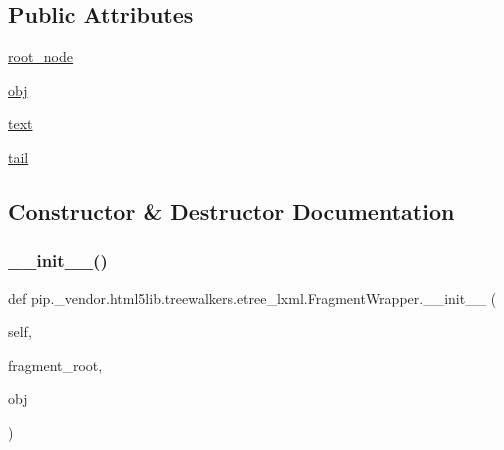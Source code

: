 \subsection*{Public Attributes}
\begin{DoxyCompactItemize}
\item 
\hyperlink{classpip_1_1__vendor_1_1html5lib_1_1treewalkers_1_1etree__lxml_1_1FragmentWrapper_ad91c1647c32b3060bf8d059090138372}{root\+\_\+node}
\item 
\hyperlink{classpip_1_1__vendor_1_1html5lib_1_1treewalkers_1_1etree__lxml_1_1FragmentWrapper_a0f74154790d95e13a7c0f260778d8c7e}{obj}
\item 
\hyperlink{classpip_1_1__vendor_1_1html5lib_1_1treewalkers_1_1etree__lxml_1_1FragmentWrapper_aaa09491cb631cafc0179e9565d516808}{text}
\item 
\hyperlink{classpip_1_1__vendor_1_1html5lib_1_1treewalkers_1_1etree__lxml_1_1FragmentWrapper_a600e467294afc50a15859f6b223af149}{tail}
\end{DoxyCompactItemize}


\subsection{Constructor \& Destructor Documentation}
\mbox{\label{classpip_1_1__vendor_1_1html5lib_1_1treewalkers_1_1etree__lxml_1_1FragmentWrapper_ad4d168d009d4f86ec6c2786e127c1885}} 
\subsubsection{\texorpdfstring{\+\_\+\+\_\+init\+\_\+\+\_\+()}{\_\_init\_\_()}}
{\footnotesize\ttfamily def pip.\+\_\+vendor.\+html5lib.\+treewalkers.\+etree\+\_\+lxml.\+Fragment\+Wrapper.\+\_\+\+\_\+init\+\_\+\+\_\+ (\begin{DoxyParamCaption}\item[{}]{self,  }\item[{}]{fragment\+\_\+root,  }\item[{}]{obj }\end{DoxyParamCaption})}




